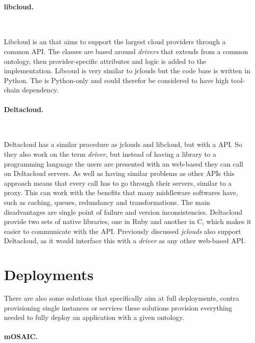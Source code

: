 \paragraph{libcloud.}~\cite{libcloud}

Libcloud is an  that aims to support the largest cloud providers through a common API. 
The classes are based around \emph{drivers} that extends from a common ontology, 
then provider-specific attributes and logic is added to the implementation.
Libcoud is very similar to jclouds but the  code base is written in Python. 
The  is Python-only and could therefor be considered to have high tool-chain dependency.

\paragraph{Deltacloud.}~\cite{deltacloud}

Deltacloud has a similar procedure as jclouds and libcloud, but with a  API. 
So they also work on the term \emph{driver}, but instead of having a library to a 
programming language the users are presented with an web-based  they can call
on Deltacloud servers. 
As well as having similar problems as other APIs this approach means 
that every call has to go through their servers, similar to a proxy. 
This can work with the benefits that many middleware softwares have, such as caching, queues, 
redundancy and transformations.
The main disadvantages are single point of failure and version inconsistencies.
Deltacloud provide two sets of native libraries, one in Ruby and another in C, which
makes it easier to communicate with the  API.
Previously discussed \emph{jclouds} also support Deltacloud, as it would interface this
with a \emph{driver} as any other web-based API.

\section{Deployments}

There are also some solutions that specifically aim at full deployments,
contra provisioning single instances or services these solutions
provision everything needed to fully deploy an application with a given ontology.

\paragraph{mOSAIC.}~\cite{portable:petcu12} 

